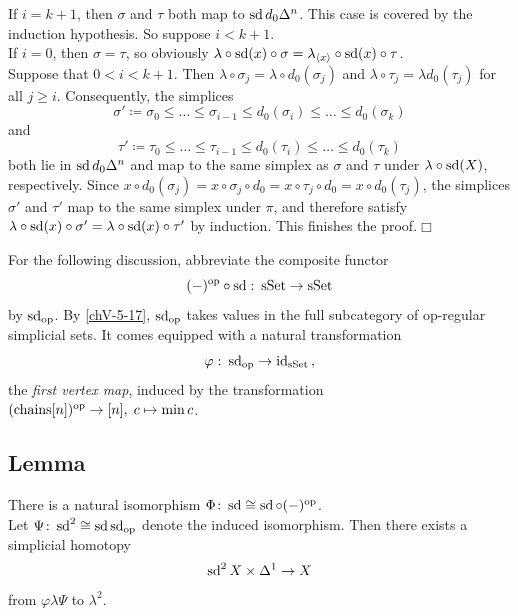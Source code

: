         If $i = k + 1$, then $\sigma$ and $\tau$ both map to $\operatorname{sd} d_0 \Delta^n$. This case is covered by the induction hypothesis. So suppose $i < k + 1$.\\
        If $i = 0$, then $\sigma = \tau$, so obviously $\lambda \circ \operatorname{sd}(x) \circ \sigma = \lambda_{\langle x \rangle} \circ \operatorname{sd}(x) \circ \tau$.\\
        Suppose that $0 < i < k + 1$. Then $\lambda \circ \sigma_j = \lambda \circ d_0(\sigma_j)$ and $\lambda \circ \tau_j = \lambda d_0(\tau_j)$ for all $j \geq i$. Consequently, the simplices
        \begin{equation*}
            \sigma' \coloneq \sigma_0 \leq \ldots \leq \sigma_{i-1} \leq d_0(\sigma_i) \leq \ldots \leq d_0(\sigma_k)
        \end{equation*}
        and
        \begin{equation*}
            \tau' \coloneq \tau_0 \leq \ldots \leq \tau_{i-1} \leq d_0(\tau_i) \leq \ldots \leq d_0(\tau_k)
        \end{equation*}
        both lie in $\operatorname{sd} d_0 \Delta^n$ and map to the same simplex as $\sigma$ and $\tau$ under $\lambda \circ \operatorname{sd}(X)$, respectively. Since $x \circ d_0(\sigma_j) = x \circ \sigma_j \circ d_0 = x \circ \tau_j \circ d_0 = x \circ d_0(\tau_j)$, the simplices $\sigma'$ and $\tau'$ map to the same simplex under $\pi$, and therefore satisfy $\lambda \circ \operatorname{sd}(x) \circ \sigma' = \lambda \circ \operatorname{sd}(x) \circ \tau'$ by induction. This finishes the proof.\hfill$\Box$
        \medskip

        For the following discussion, abbreviate the composite functor
        \begin{equation*}
            (-)^{\operatorname{op}} \circ \operatorname{sd} \,\colon \operatorname{sSet} \to \operatorname{sSet}
        \end{equation*}
        by $\operatorname{sd}_{\operatorname{op}}$. By \ref{chV-5-17}, $\operatorname{sd}_{\operatorname{op}}$ takes values in the full subcategory of op-regular simplicial sets. It comes equipped with a natural transformation
        \begin{equation*}
            \varphi \,\colon \operatorname{sd}_{\operatorname{op}} \to \operatorname{id}_{\operatorname{sSet}} \,,
        \end{equation*}
        the \emph{first vertex map}, induced by the transformation $(\operatorname{chains}[n])^{\operatorname{op}} \to [n], \; c \mapsto \min c$.

    \subsection{Lemma}\label{chV-5-20}
        There is a natural isomorphism $\Phi \colon \operatorname{sd} \cong \operatorname{sd} \circ (-)^{\operatorname{op}}$.\\
        Let $\Psi \colon \operatorname{sd}^2 \cong \operatorname{sd} \operatorname{sd}_{\operatorname{op}}$ denote the induced isomorphism. Then there exists a simplicial homotopy
        \begin{equation*}
            \operatorname{sd}^2 X \times \Delta^1 \to X
        \end{equation*}
        from $\varphi \lambda \Psi$ to $\lambda^2$.
        \smallskip

